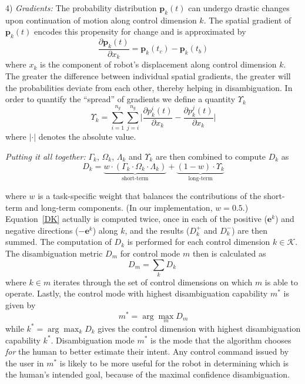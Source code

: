 \documentclass[natbib, twocolumn]{svjour3}          %
\newcommand{\argmax}{\arg\!\max}
\begin{document}
4) \textit{Gradients:} The probability distribution $\boldsymbol{p}_k(t)$ can undergo drastic changes upon continuation of motion along control dimension $k$. The spatial gradient of $\boldsymbol{p}_k(t)$ encodes this propensity for change and is approximated by 
\begin{equation*}
\frac{\partial\boldsymbol{p}_k(t)}{\partial x_k} = \boldsymbol{p}_k(t_c) - \boldsymbol{p}_k(t_b)
\end{equation*}
where $x_k$ is the component of robot's displacement along control dimension $k$. The greater the difference between individual spatial gradients, the greater will the probabilities deviate from each other, thereby helping in disambiguation. In order to quantify the ``spread'' of gradients we define a quantity $\Upsilon_k$ 
\begin{equation}
\Upsilon_k = \sum_{i=1}^{n_g}\sum_{j=i}^{n_g}\Big \lvert\frac{\partial p^i_k(t)}{\partial x_k} - \frac{\partial p^j_k(t)}{\partial x_k}\Big \rvert
\end{equation}
where $\lvert\cdot\rvert$ denotes the absolute value. 

\textit{Putting it all together:}
$\Gamma_k$, $\Omega_k$, $\Lambda_k$ and $\Upsilon_k$ are then combined to compute $D_{k}$ as 
\begin{equation}\label{DK}
D_{k} = \underbrace{w\cdot(\Gamma_k\cdot \Omega_k\cdot\Lambda_k)}_{\text{short-term}} + \underbrace{(1 - w)\cdot \Upsilon_k}_{\text{long-term}}
\end{equation}

where $w$ is a task-specific weight that balances the contributions of the short-term and long-term components. (In our implementation, $w=0.5$.) Equation~\ref{DK} actually is computed twice, once in each of the positive ($\boldsymbol{e}^k$) and negative directions ($-\boldsymbol{e}^k$) along $k$, and the results ($D_k^+$ and $D_k^-$) are then summed. The computation of $D_k$ is performed for each control dimension $k \in \mathcal{K}$. The disambiguation metric $D_m$ for control mode $m$ then is calculated as 
\begin{equation*}\label{EQ2}
D_m = \sum_{k} D_{k} \;
\end{equation*}
where $k \in m$ iterates through the set of control dimensions on which $m$ is able to operate.
Lastly, the control mode with highest disambiguation capability $m^*$ is given by
\begin{equation*}
m^* = \argmax_m  D_{m}
\end{equation*}
while $k^* = \argmax_k D_k$ gives the control dimension with highest disambiguation capability $k^{*}$.
Disambiguation mode $m^{*}$ is the mode that the algorithm chooses \textit{for} the human to better estimate their intent. Any control command issued by the user in $m^*$ is likely to be more useful for the robot in determining which is the human's intended goal, because of the maximal confidence disambiguation.
\end{document}
